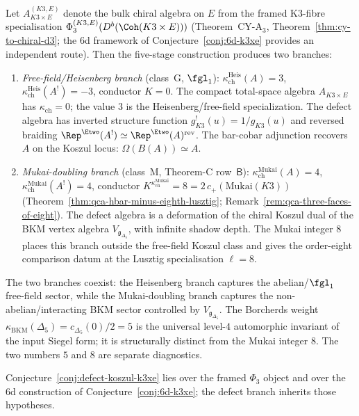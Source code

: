 \begin{conjecture}
\label{conj:defect-koszul-k3xe}
\ClaimStatusConjectured
Let $A_{K3 \times E}^{(K3,E)}$ denote the bulk chiral algebra on $E$ from the framed K3-fibre specialisation $\Phi_3^{(K3,E)}(D^b(\Coh(K3 \times E)))$ (Theorem~CY-A$_3$, Theorem~\ref{thm:cy-to-chiral-d3}; the 6d framework of Conjecture~\ref{conj:6d-k3xe} provides an independent route). Then the five-stage construction produces two branches:
\begin{enumerate}[label=\textup{(\roman*)}]
 \item \emph{Free-field/Heisenberg branch} (class~G, $\fgl_1$):
 $\kappa_{\mathrm{ch}}^{\mathrm{Heis}}(A) = 3$,
 $\kappa_{\mathrm{ch}}^{\mathrm{Heis}}(A^!) = -3$,
 conductor $K = 0$. The compact total-space algebra
 $A_{K3\times E}$ has $\kappa_{\mathrm{ch}}=0$; the value $3$
 is the Heisenberg/free-field specialization. The defect algebra
 has inverted structure function $g^!_{K3}(u) = 1/g_{K3}(u)$
 and reversed braiding
 $\Rep^{\Etwo}(A^!) \simeq \Rep^{\Etwo}(A)^{\mathrm{rev}}$.
 The bar-cobar adjunction recovers $A$ on the Koszul locus:
 $\Omega(B(A)) \simeq A$.
 \item \emph{Mukai-doubling branch} (class~M, Theorem-C row~$\mathsf{B}$):
 $\kappa_{\mathrm{ch}}^{\mathrm{Mukai}}(A) = 4$,
 $\kappa_{\mathrm{ch}}^{\mathrm{Mukai}}(A^!) = 4$,
 conductor $K^{\kappa_{\mathrm{ch}}^{\mathrm{Mukai}}} = 8 = 2\,c_+(\mathrm{Mukai}(K3))$
 (Theorem~\ref{thm:qca-hbar-minus-eighth-lusztig};
 Remark~\ref{rem:qca-three-faces-of-eight}). The defect algebra is
 a deformation of the chiral Koszul dual of the BKM vertex algebra
 $V_{\mathfrak{g}_{\Delta_5}}$, with infinite shadow depth. The
 Mukai integer \(8\) places this branch outside the free-field Koszul
 class and gives the order-eight comparison datum at the Lusztig
 specialisation \(\ell=8\).
\end{enumerate}
The two branches coexist: the Heisenberg branch captures the abelian/$\fgl_1$ free-field sector, while the Mukai-doubling branch captures the non-abelian/interacting BKM sector controlled by $V_{\mathfrak{g}_{\Delta_5}}$. The Borcherds weight $\kappa_{\mathrm{BKM}}(\Delta_5) = c_{\Delta_5}(0)/2 = 5$ is the universal level-$4$ automorphic invariant of the input Siegel form; it is structurally distinct from the Mukai integer \(8\). The two numbers \(5\) and \(8\) are separate diagnostics.

Conjecture~\ref{conj:defect-koszul-k3xe} lies over the framed $\Phi_3$
object and over the 6d construction of Conjecture~\ref{conj:6d-k3xe};
the defect branch inherits those hypotheses.
\end{conjecture}

